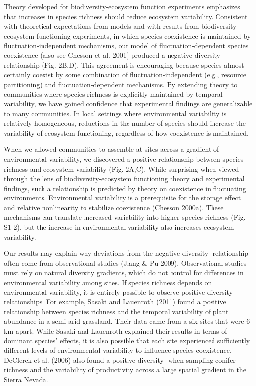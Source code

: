 \documentclass[12pt,]{article}
\begin{document}
Theory developed for biodiversity-ecosystem function experiments
emphasizes that increases in species richness should reduce ecosystem
variability. Consistent with theoretical expectations from models and
with results from biodiversity-ecosystem functioning experiments, in
which species coexistence is maintained by fluctuation-independent
mechanisms, our model of fluctuation-dependent species coexistence (also
see Chesson et al. 2001) produced a negative
diversity- relationship (Fig. 2B,D). This
agreement is encouraging because species almost certainly coexist by
some combination of fluctuation-independent (e.g., resource
partitioning) and fluctuation-dependent mechanisms. By extending theory
to communities where species richness is explicitly maintained by
temporal variability, we have gained confidence that experimental
findings are generalizable to many communities. In local settings where
environmental variability is relatively homogeneous, reductions in the
number of species should increase the variability of ecosystem
functioning, regardless of how coexistence is maintained.

When we allowed communities to assemble at sites across a gradient of
environmental variability, we discovered a positive relationship between
species richness and ecosystem variability (Fig. 2A,C). While surprising
when viewed through the lens of biodiversity-ecosystem functioning
theory and experimental findings, such a relationship is predicted by
theory on coexistence in fluctuating environments. Environmental
variability is a prerequisite for the storage effect and relative
nonlinearity to stabilize coexistence (Chesson 2000a). These mechanisms
can translate increased variability into higher species richness (Fig.
S1-2), but the increase in environmental variability also increases
ecosystem variability.

Our results may explain why deviations from the negative
diversity- relationship often come from
observational studies (Jiang \& Pu 2009). Observational studies must
rely on natural diversity gradients, which do not control for
differences in environmental variability among sites. If species
richness depends on environmental variability, it is entirely possible
to observe positive diversity- relationships.
For example, Sasaki and Lauenroth (2011) found a positive relationship
between species richness and the temporal variability of plant abundance
in a semi-arid grassland. Their data came from a six sites that were 6
km apart. While Sasaki and Lauenroth explained their results in terms of
dominant species' effects, it is also possible that each site
experienced sufficiently different levels of environmental variability
to influence species coexistence. DeClerck et al. (2006) also found a
positive diversity- when sampling conifer
richness and the variability of productivity across a large spatial
gradient in the Sierra Nevada.
\end{document}
